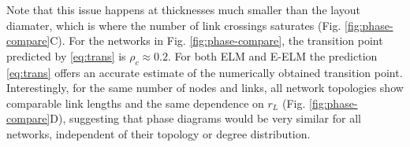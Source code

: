 \documentclass[nofootinbib,preprint,floatfix,titlepage,endfloats]{revtex4} %
\begin{document}
Note that this issue happens at thicknesses much smaller than the layout diamater, which is where the number of link crossings saturates (Fig. \ref{fig:phase-compare}C).
For the networks in Fig. \ref{fig:phase-compare}, the transition point
predicted by \eqref{eq:trans} is 
    $\rho_c \approx 0.2$.
For both ELM and E-ELM the prediction \eqref{eq:trans} offers an accurate estimate of the numerically obtained transition point. 
Interestingly, for the same number of nodes and links, all network topologies show comparable link lengths and the same dependence on $r_L$ (Fig. \ref{fig:phase-compare}D), 
suggesting that phase diagrams would be very similar for all networks, independent of their topology or degree distribution.
 

\end{document}
